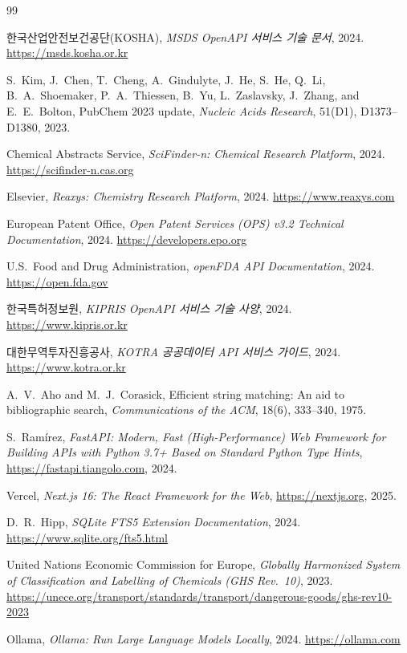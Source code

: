 \documentclass[preprint,12pt]{elsarticle}
\begin{document}
\begin{thebibliography}{99}

한국산업안전보건공단(KOSHA),
\emph{MSDS OpenAPI 서비스 기술 문서}, 2024.
\url{https://msds.kosha.or.kr}

S.~Kim, J.~Chen, T.~Cheng, A.~Gindulyte, J.~He, S.~He, Q.~Li, B.~A.~Shoemaker, P.~A.~Thiessen, B.~Yu, L.~Zaslavsky, J.~Zhang, and E.~E.~Bolton,
PubChem 2023 update,
\emph{Nucleic Acids Research}, 51(D1), D1373--D1380, 2023.

Chemical Abstracts Service,
\emph{SciFinder-n: Chemical Research Platform}, 2024.
\url{https://scifinder-n.cas.org}

Elsevier,
\emph{Reaxys: Chemistry Research Platform}, 2024.
\url{https://www.reaxys.com}

European Patent Office,
\emph{Open Patent Services (OPS) v3.2 Technical Documentation}, 2024.
\url{https://developers.epo.org}

U.S.\ Food and Drug Administration,
\emph{openFDA API Documentation}, 2024.
\url{https://open.fda.gov}

한국특허정보원,
\emph{KIPRIS OpenAPI 서비스 기술 사양}, 2024.
\url{https://www.kipris.or.kr}

대한무역투자진흥공사,
\emph{KOTRA 공공데이터 API 서비스 가이드}, 2024.
\url{https://www.kotra.or.kr}

A.~V.~Aho and M.~J.~Corasick,
Efficient string matching: An aid to bibliographic search,
\emph{Communications of the ACM}, 18(6), 333--340, 1975.

S.~Ram\'{i}rez,
\emph{FastAPI: Modern, Fast (High-Performance) Web Framework for Building APIs with Python 3.7+ Based on Standard Python Type Hints},
\url{https://fastapi.tiangolo.com}, 2024.

Vercel,
\emph{Next.js 16: The React Framework for the Web},
\url{https://nextjs.org}, 2025.

D.~R.~Hipp,
\emph{SQLite FTS5 Extension Documentation}, 2024.
\url{https://www.sqlite.org/fts5.html}

United Nations Economic Commission for Europe,
\emph{Globally Harmonized System of Classification and Labelling of Chemicals (GHS Rev.~10)}, 2023.
\url{https://unece.org/transport/standards/transport/dangerous-goods/ghs-rev10-2023}

Ollama,
\emph{Ollama: Run Large Language Models Locally}, 2024.
\url{https://ollama.com}

\end{thebibliography}
\end{document}
